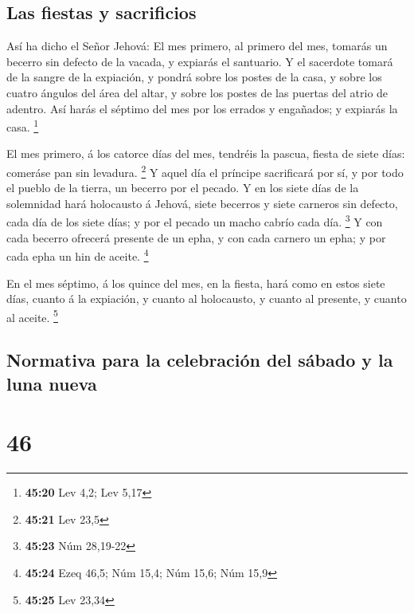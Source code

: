 \hypertarget{las-fiestas-y-sacrificios}{%
\subsection{Las fiestas y sacrificios}\label{las-fiestas-y-sacrificios}}

 Así ha dicho el Señor Jehová: El mes primero, al primero
del mes, tomarás un becerro sin defecto de la vacada, y expiarás el
santuario.  Y el sacerdote tomará de la sangre de la
expiación, y pondrá sobre los postes de la casa, y sobre los cuatro
ángulos del área del altar, y sobre los postes de las puertas del atrio
de adentro.  Así harás el séptimo del mes por los errados
y engañados; y expiarás la casa. \footnote{\textbf{45:20} Lev 4,2; Lev
  5,17}

 El mes primero, á los catorce días del mes, tendréis la
pascua, fiesta de siete días: comeráse pan sin levadura. \footnote{\textbf{45:21}
  Lev 23,5}  Y aquel día el príncipe sacrificará por sí,
y por todo el pueblo de la tierra, un becerro por el pecado.
 Y en los siete días de la solemnidad hará holocausto á
Jehová, siete becerros y siete carneros sin defecto, cada día de los
siete días; y por el pecado un macho cabrío cada día. \footnote{\textbf{45:23}
  Núm 28,19-22}  Y con cada becerro ofrecerá presente de
un epha, y con cada carnero un epha; y por cada epha un hin de aceite.
\footnote{\textbf{45:24} Ezeq 46,5; Núm 15,4; Núm 15,6; Núm 15,9}

 En el mes séptimo, á los quince del mes, en la fiesta,
hará como en estos siete días, cuanto á la expiación, y cuanto al
holocausto, y cuanto al presente, y cuanto al aceite. \footnote{\textbf{45:25}
  Lev 23,34}

\hypertarget{normativa-para-la-celebraciuxf3n-del-suxe1bado-y-la-luna-nueva}{%
\subsection{Normativa para la celebración del sábado y la luna
nueva}\label{normativa-para-la-celebraciuxf3n-del-suxe1bado-y-la-luna-nueva}}

\hypertarget{section-45}{%
\section{46}\label{section-45}}

